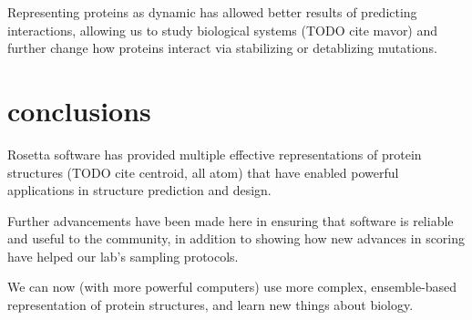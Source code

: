 Representing proteins as dynamic has allowed better results of predicting interactions, allowing us to study biological systems (TODO cite mavor) and further change how proteins interact via stabilizing or detablizing mutations.


\section{conclusions}

Rosetta software has provided multiple effective representations of protein structures (TODO cite centroid, all atom) that have enabled powerful applications in structure prediction and design.

Further advancements have been made here in ensuring that software is reliable and useful to the community, in addition to showing how new advances in scoring have helped our lab's sampling protocols.

We can now (with more powerful computers) use more complex, ensemble-based representation of protein structures, and learn new things about biology.